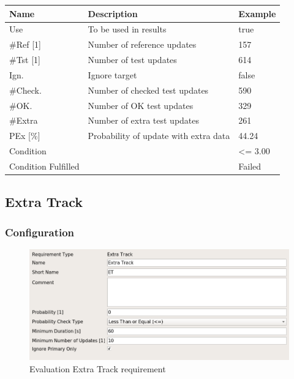 \begin{center}
 \begin{table}[H]
  \begin{tabularx}{\textwidth}{ | l | X |  l | }
    \hline
    \textbf{Name} & \textbf{Description} & \textbf{Example} \\ \hline
    Use & To be used in results & true \\ \hline
    \#Ref [1] & Number of reference updates & 157 \\ \hline
    \#Tst [1] & Number of test updates & 614 \\ \hline
    Ign. & Ignore target & false \\ \hline
    \#Check. & Number of checked test updates & 590 \\ \hline
    \#OK. & Number of OK test updates & 329 \\ \hline
    \#Extra & Number of extra test updates & 261 \\ \hline
    PEx [\%] & Probability of update with extra data & 44.24 \\ \hline
    Condition &  & <= 3.00 \\ \hline
    Condition Fulfilled &  & Failed \\ \hline
\end{tabularx}
\end{table}
\end{center}

\subsection{Extra Track}
\label{sec:eval_req_extra_track} 

\subsubsection{Configuration}

\begin{figure}[H]
    \includegraphics[width=14cm,frame]{figures/eval_req_extra_track.png}
  \caption{Evaluation Extra Track requirement}
\end{figure}

